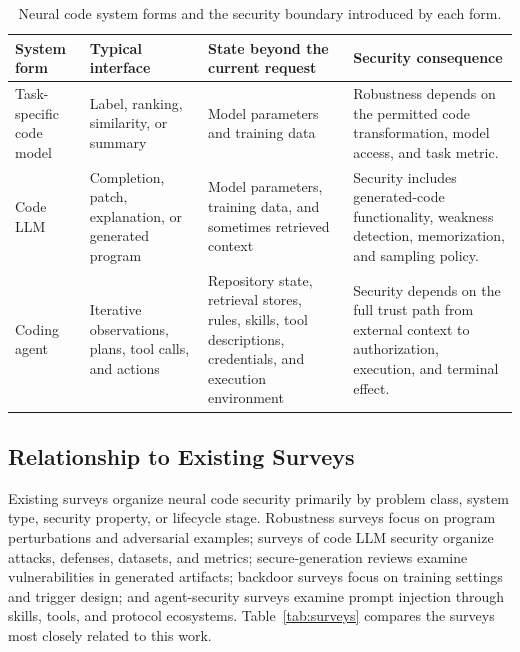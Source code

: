 \documentclass[acmsmall,screen,review]{acmart}
\begin{document}
\begin{table}[t]
\centering
\caption{Neural code system forms and the security boundary introduced by each form.}
\label{tab:system-forms}
\begin{tabularx}{\textwidth}{@{}L{2.6cm}L{3.1cm}L{3.6cm}Y@{}}
\toprule
\textbf{System form} & \textbf{Typical interface} & \textbf{State beyond the current request} & \textbf{Security consequence} \\
\midrule
Task-specific code model & Label, ranking, similarity, or summary & Model parameters and training data & Robustness depends on the permitted code transformation, model access, and task metric. \\
\midrule
Code LLM & Completion, patch, explanation, or generated program & Model parameters, training data, and sometimes retrieved context & Security includes generated-code functionality, weakness detection, memorization, and sampling policy. \\
\midrule
Coding agent & Iterative observations, plans, tool calls, and actions & Repository state, retrieval stores, rules, skills, tool descriptions, credentials, and execution environment & Security depends on the full trust path from external context to authorization, execution, and terminal effect. \\
\bottomrule
\end{tabularx}
\end{table}

\subsection{Relationship to Existing Surveys}

Existing surveys organize neural code security primarily by problem class, system type, security property, or lifecycle stage. Robustness surveys focus on program perturbations and adversarial examples; surveys of code LLM security organize attacks, defenses, datasets, and metrics; secure-generation reviews examine vulnerabilities in generated artifacts; backdoor surveys focus on training settings and trigger design; and agent-security surveys examine prompt injection through skills, tools, and protocol ecosystems. Table~\ref{tab:surveys} compares the surveys most closely related to this work.
\end{document}
